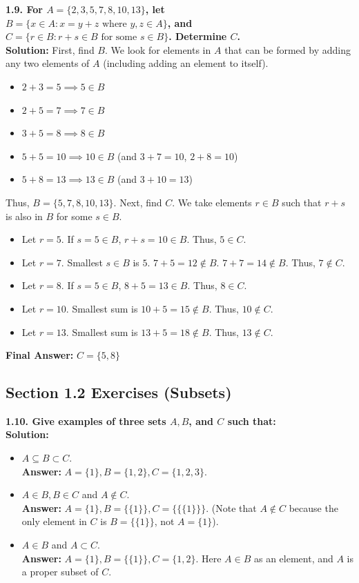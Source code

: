 \documentclass[12pt]{article}
\begin{document}
\vspace{0.5cm}
\textbf{1.9. For $A = \{2, 3, 5, 7, 8, 10, 13\}$, let \\
$B = \{x \in A : x = y + z \text{ where } y, z \in A\}$, and $C = \{r \in B : r + s \in B \text{ for some } s \in B\}$. Determine $C$.} \\
\textbf{Solution:}
First, find $B$. We look for elements in $A$ that can be formed by adding any two elements of $A$ (including adding an element to itself).
\begin{itemize}
    \item $2+3=5 \implies 5 \in B$
    \item $2+5=7 \implies 7 \in B$
    \item $3+5=8 \implies 8 \in B$
    \item $5+5=10 \implies 10 \in B$ (and $3+7=10$, $2+8=10$)
    \item $5+8=13 \implies 13 \in B$ (and $3+10=13$)
\end{itemize}
Thus, $B = \{5, 7, 8, 10, 13\}$.
Next, find $C$. We take elements $r \in B$ such that $r+s$ is also in $B$ for some $s \in B$.
\begin{itemize}
    \item Let $r = 5$. If $s = 5 \in B$, $r+s = 10 \in B$. Thus, $5 \in C$.
    \item Let $r = 7$. Smallest $s \in B$ is $5$. $7+5=12 \notin B$. $7+7=14 \notin B$. Thus, $7 \notin C$.
    \item Let $r = 8$. If $s = 5 \in B$, $8+5 = 13 \in B$. Thus, $8 \in C$.
    \item Let $r = 10$. Smallest sum is $10+5=15 \notin B$. Thus, $10 \notin C$.
    \item Let $r = 13$. Smallest sum is $13+5=18 \notin B$. Thus, $13 \notin C$.
\end{itemize}
\textbf{Final Answer:} $C = \{5, 8\}$

\subsection{Section 1.2 Exercises (Subsets)}

\textbf{1.10. Give examples of three sets $A, B$, and $C$ such that:} \\
\textbf{Solution:}
\begin{itemize}
    \item[(a)] $A \subseteq B \subset C$. \\
    \textbf{Answer:} $A = \{1\}, B = \{1, 2\}, C = \{1, 2, 3\}$.
    \item[(b)] $A \in B, B \in C$ and $A \notin C$. \\
    \textbf{Answer:} $A = \{1\}, B = \{\{1\}\}, C = \{\{\{1\}\}\}$. (Note that $A \notin C$ because the only element in $C$ is $B = \{\{1\}\}$, not $A = \{1\}$).
    \item[(c)] $A \in B$ and $A \subset C$. \\
    \textbf{Answer:} $A = \{1\}, B = \{\{1\}\}, C = \{1, 2\}$. Here $A \in B$ as an element, and $A$ is a proper subset of $C$.
\end{itemize}
\end{document}
